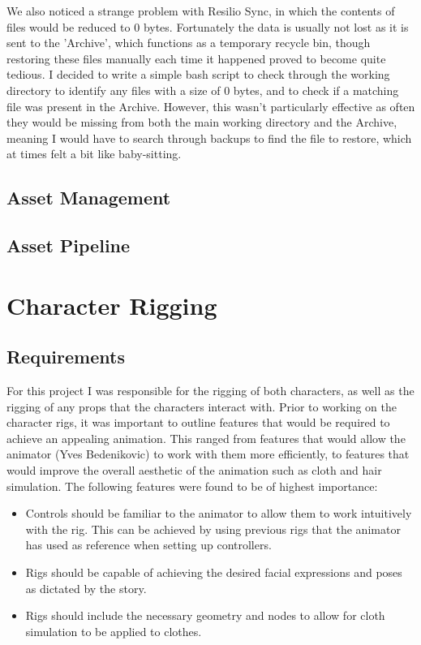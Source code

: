 \documentclass[11pt]{article}
\begin{document}
We also noticed a strange problem with Resilio Sync, in which the contents of files would be reduced to 0 bytes. Fortunately the data is usually not lost as it is sent to the 'Archive', which functions as a temporary recycle bin, though restoring these files manually each time it happened proved to become quite tedious. I decided to write a simple bash script to check through the working directory to identify any files with a size of 0 bytes, and to check if a matching file was present in the Archive. However, this wasn't particularly effective as often they would be missing from both the main working directory and the Archive, meaning I would have to search through backups to find the file to restore, which at times felt a bit like baby-sitting.

\subsection{Asset Management}

\subsection{Asset Pipeline}

\section{Character Rigging}

\subsection{Requirements}

For this project I was responsible for the rigging of both characters, as well as the rigging of any props that the characters interact with. Prior to working on the character rigs, it was important to outline features that would be required to achieve an appealing animation. This ranged from features that would allow the animator (Yves Bedenikovic) to work with them more efficiently, to features that would improve the overall aesthetic of the animation such as cloth and hair simulation. The following features were found to be of highest importance:

\begin{itemize}

\item Controls should be familiar to the animator to allow them to work intuitively with the rig. This can be achieved by using previous rigs that the animator has used as reference when setting up controllers.

\item Rigs should be capable of achieving the desired facial expressions and poses as dictated by the story.

\item Rigs should include the necessary geometry and nodes to allow for cloth simulation to be applied to clothes.

\end{itemize}
\end{document}
